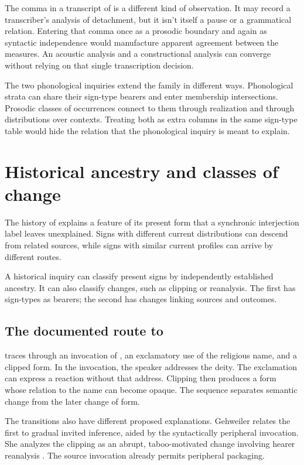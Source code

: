 \documentclass[12pt]{article}
\begin{document}
The comma in a transcript of 
is a different kind of observation. It may record a transcriber's
analysis of detachment, but it isn't itself a pause or a grammatical
relation. Entering that comma once as a prosodic boundary and again
as syntactic independence would manufacture apparent agreement between
the measures. An acoustic analysis and a constructional analysis can
converge without relying on that single transcription decision.

The two phonological inquiries extend the family in different ways. Phonological strata can share their sign-type bearers and
enter membership intersections. Prosodic classes of occurrences connect
to them through realization and through distributions over contexts.
Treating both as extra columns in the same sign-type table would hide
the relation that the phonological inquiry is meant to explain.

\section{Historical ancestry and classes of change}\label{sec:history}

The history of  explains a feature of its present form
that a synchronic interjection label leaves unexplained. Signs with
different current distributions can descend from related sources, while
signs with similar current profiles can arrive by different routes.

A historical inquiry can classify present signs by independently established
ancestry. It can also classify changes, such as clipping or reanalysis.
The first has sign-types as bearers; the second has changes linking
sources and outcomes.

\subsection{The documented route to }

\textcite{gehweiler2008} traces  through an invocation of ,
an exclamatory use of the religious name, and a clipped form. In the invocation, the speaker addresses the deity.
The exclamation can express a reaction without that address. Clipping
then produces a form whose relation to the name can become opaque.
The sequence separates semantic change from the later change of form.

The transitions also have different proposed explanations. Gehweiler
relates the first to gradual invited inference, aided by the syntactically
peripheral invocation. She analyzes the clipping as an abrupt, taboo-motivated
change involving hearer reanalysis \citep[84--88]{gehweiler2008}. The
source invocation already permits peripheral packaging.
\end{document}
